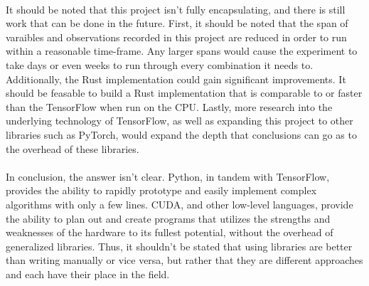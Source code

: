 \documentclass[12pt]{article}
\begin{document}
\paragraph{}
It should be noted that this project isn't fully encapsulating, and there is still work that can be done in the future.
First, it should be noted that the span of varaibles and observations recorded in this project are reduced in order to run within a reasonable time-frame.
Any larger spans would cause the experiment to take days or even weeks to run through every combination it needs to.
Additionally, the Rust implementation could gain significant improvements.
It should be feasable to build a Rust implementation that is comparable to or faster than the TensorFlow when run on the CPU.
Lastly, more research into the underlying technology of TensorFlow, as well as expanding this project to other libraries such as PyTorch, would expand the depth that conclusions can go as to the overhead of these libraries.

\paragraph{}
In conclusion, the answer isn't clear.
Python, in tandem with TensorFlow, provides the ability to rapidly prototype and easily implement complex algorithms with only a few lines.
CUDA, and other low-level languages, provide the ability to plan out and create programs that utilizes the strengths and weaknesses of the hardware to its fullest potential, without the overhead of generalized libraries.
Thus, it shouldn't be stated that using libraries are better than writing manually or vice versa, but rather that they are different approaches and each have their place in the field.



\newpage


\end{document}
